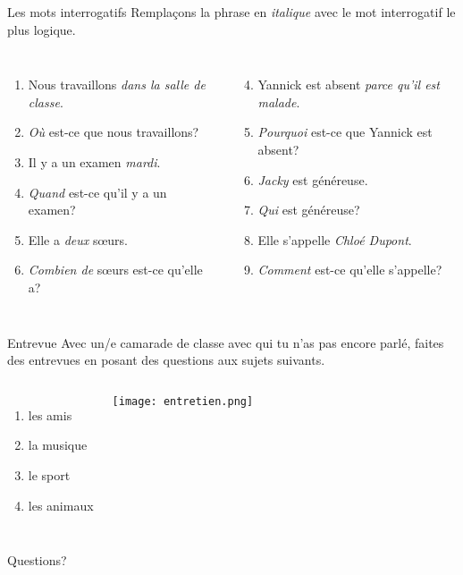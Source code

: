 \documentclass{beamer}
\begin{document}
  \begin{frame}{Les mots interrogatifs}
    Remplaçons la phrase en \emph{italique} avec le mot interrogatif le plus logique. \\
    \begin{columns}[t]
        \begin{enumerate}
          \item Nous travaillons \emph{dans la salle de classe}.
          \item<2->[$\to$] \emph{Où} est-ce que nous travaillons?
          \item Il y a un examen \emph{mardi}.
          \item<3->[$\to$] \emph{Quand} est-ce qu'il y a un examen?
          \item Elle a \emph{deux} sœurs.
          \item<4->[$\to$] \emph{Combien de} sœurs est-ce qu'elle a?
        \end{enumerate}
        \begin{enumerate}
          \setcounter{enumi}{3}
          \item Yannick est absent \emph{parce qu'il est malade}.
          \item<5->[$\to$] \emph{Pourquoi} est-ce que Yannick est absent?
          \item \emph{Jacky} est généreuse.
          \item<6->[$\to$] \emph{Qui} est généreuse?
          \item Elle s'appelle \emph{Chloé Dupont}.
          \item<7->[$\to$] \emph{Comment} est-ce qu'elle s'appelle?
        \end{enumerate}
    \end{columns}
  \end{frame}

  \begin{frame}{Entrevue}
    Avec un/e camarade de classe avec qui tu n'as pas encore parlé, faites des entrevues en posant des questions aux sujets suivants.  \\
    \begin{columns}
        \begin{enumerate}
          \item les amis
          \item la musique
          \item le sport
          \item les animaux
        \end{enumerate}
        \begin{center}
          \texttt{[image: entretien.png]}
        \end{center}
    \end{columns}
  \end{frame}

  \begin{frame}{}
    \begin{center}
      \Large Questions?
    \end{center}
  \end{frame}
\end{document}
